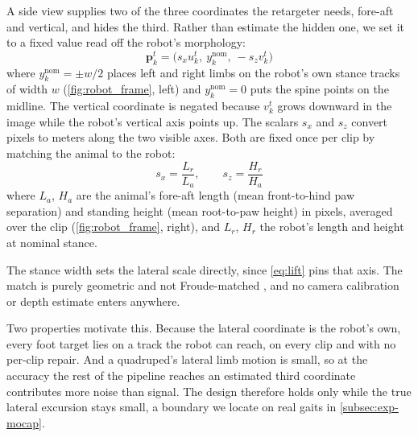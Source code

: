 \documentclass[letterpaper, 10 pt, conference]{ieeeconf}
\newcommand{\length}{L}
\newcommand{\height}{H}
\newcommand{\robotLength}{\length_r}
\newcommand{\robotHeight}{\height_r}
\newcommand{\animalLength}{\length_a}
\newcommand{\animalHeight}{\height_a}
\begin{document}
A side view supplies two of the three coordinates the retargeter needs, fore-aft and vertical, and hides the third. Rather than estimate the hidden one, we set it to a fixed value read off the robot's morphology:
\begin{equation}
\mathbf{p}_k^t = \big( s_x u_k^t,\ y_k^{\mathrm{nom}},\ -s_z v_k^t \big)
\label{eq:lift}
\end{equation}
where $y_k^{\mathrm{nom}}={\pm}w/2$ places left and right limbs on the robot's own stance tracks of width $w$ (\autoref{fig:robot_frame}, left) and $y_k^{\mathrm{nom}}{=}0$ puts the spine points on the midline. The vertical coordinate is negated because $v_k^t$ grows downward in the image while the robot's vertical axis points up.
The scalars $s_x$ and $s_z$ convert pixels to meters along the two visible axes. Both are fixed once per clip by matching the animal to the robot:
\begin{equation}
s_x = \frac{\robotLength}{\animalLength},
\qquad
s_z = \frac{\robotHeight}{\animalHeight}
\label{eq:scale}
\end{equation}
where $\animalLength$, $\animalHeight$ are the animal's fore-aft length (mean front-to-hind paw separation) and standing height (mean root-to-paw height) in pixels, averaged over the clip (\autoref{fig:robot_frame}, right), and $\robotLength$, $\robotHeight$ the robot's length and height at nominal stance.



The stance width sets the lateral scale directly, since \autoref{eq:lift} pins that axis. The match is purely geometric and not Froude-matched \cite{alexander1983dynamic}, and no camera calibration or depth estimate enters anywhere.

Two properties motivate this. Because the lateral coordinate is the robot's own, every foot target lies on a track the robot can reach, on every clip and with no per-clip repair. And a quadruped's lateral limb motion is small, so at the accuracy the rest of the pipeline reaches an estimated third coordinate contributes more noise than signal. The design therefore holds only while the true lateral excursion stays small, a boundary we locate on real gaits in \autoref{subsec:exp-mocap}.
\end{document}
